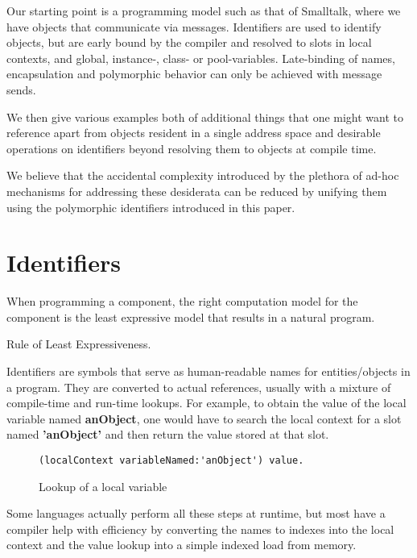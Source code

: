 \documentclass[preprint,authoryear]{acm_proc_article-sp}
\begin{document}
Our starting point is a programming model such as that of Smalltalk, where we have objects
that communicate via messages\cite{Goldberg1983}.   Identifiers are used to identify 
objects, but are early bound by the compiler and resolved to slots in local contexts, and 
global, instance-, class- or pool-variables.  Late-binding of names, encapsulation and
polymorphic behavior can only be achieved with message sends.

We then give various examples both of additional things that one might want to reference 
 apart from objects resident in a single address space  and
desirable operations on identifiers beyond resolving them to objects at compile time.

We believe that the accidental complexity \cite{Brooks87nosilver} introduced by the
plethora of ad-hoc mechanisms for addressing these desiderata can be reduced 
by unifying them using the polymorphic identifiers introduced in this paper.


\section{Identifiers}
\label{identifiers}
\epigraph{When programming a component, the right computation model for the component is the least expressive model that results in a natural program.}{Rule of Least Expressiveness.}

Identifiers are symbols that serve as human-readable names for entities/objects
in a program.  They are converted to actual references, usually with a mixture of
compile-time and run-time lookups.  For example, to obtain the value of the local
variable named {\bf anObject}, one would have to search the local context for
a slot named {\bf 'anObject'} and then return the value stored at that slot.


\begin{figure}[htbp]
\begin{center}
\begin{verbatim}
(localContext variableNamed:'anObject') value.
\end{verbatim}
\caption{Lookup of a local variable}
\label{variable-lookup}
\end{center}
\end{figure}


Some  languages actually perform all these steps at runtime, but most 
have a compiler help with efficiency by converting the names to indexes into
the local context and the value lookup into a simple indexed load from memory.
\end{document}
